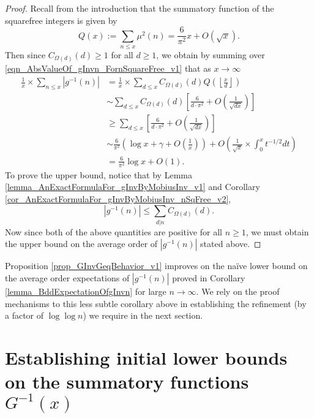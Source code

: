 \documentclass[11pt,reqno,a4letter]{article}
\numberwithin{figure}{section}
\numberwithin{table}{section}
\newcommand{\Floor}[2]{\ensuremath{\left\lfloor \frac{#1}{#2} \right\rfloor}}
\theoremstyle{plain}
\numberwithin{theorem}{section}
\theoremstyle{definition}
\begin{document}
\begin{proof}
Recall from the introduction that the summatory function of the 
squarefree integers is given by 
\[
Q(x) := \sum_{n \leq x} \mu^2(n) = \frac{6}{\pi^2} x + O(\sqrt{x}). 
\]
Then since $C_{\Omega(d)}(d) \geq 1$ for all $d \geq 1$, we obtain by summing over 
\eqref{eqn_AbsValueOf_gInvn_FornSquareFree_v1} that as $x \rightarrow \infty$ 
\begin{align*} 
\frac{1}{x} \times \sum_{n \leq x} |g^{-1}(n)| & = \frac{1}{x} \times \sum_{d \leq x} 
     C_{\Omega(d)}(d) Q\left(\Floor{x}{d}\right) \\ 
     & \sim \sum_{d \leq x} C_{\Omega(d)}(d) \left[\frac{6}{d \cdot \pi^2} + O\left(\frac{1}{\sqrt{dx}}\right) 
     \right] \\ 
     & \geq \sum_{d \leq x} \left[\frac{6}{d \cdot \pi^2} + O\left(\frac{1}{\sqrt{dx}}\right)\right] \\ 
     & \sim \frac{6}{\pi^2}\left(\log x + \gamma + O\left(\frac{1}{x}\right)\right) + 
     O\left(\frac{1}{\sqrt{x}} \times \int_0^{x} t^{-1/2} dt\right) \\ 
     & = \frac{6}{\pi^2} \log x + O(1). 
\end{align*} 
To prove the upper bound, notice that by 
Lemma \ref{lemma_AnExactFormulaFor_gInvByMobiusInv_v1} and 
Corollary \ref{cor_AnExactFormulaFor_gInvByMobiusInv_nSqFree_v2}, 
\[
|g^{-1}(n)| \leq \sum_{d|n} C_{\Omega(d)}(d). 
\]
Now since both of the above quantities are positive for all $n \geq 1$, 
we must obtain the upper bound on the average order of $|g^{-1}(n)|$
stated above. 
\end{proof} 

Proposition \ref{prop_GInvGeqBehavior_v1} improves on the na\"ive lower bound on the 
average order expectations of $|g^{-1}(n)|$ proved in 
Corollary \ref{lemma_BddExpectationOfgInvn} 
for large $n \rightarrow \infty$. 
We rely on the proof mechanisms to this less subtle corollary above in 
establishing the refinement (by a factor of $\log\log n$) 
we require in the next section. 

\newpage 
\section{Establishing initial lower bounds on the summatory functions $G^{-1}(x)$} 
\label{Section_ProofOfValidityOfAverageOrderLowerBounds} 
\end{document}
